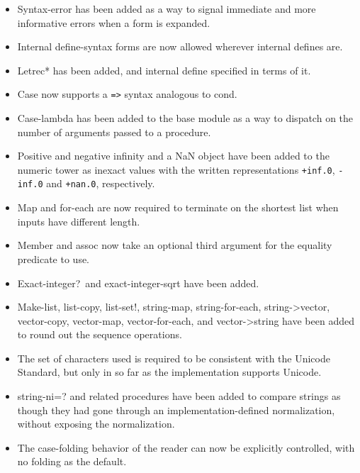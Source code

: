 \begin{itemize}
\item {\cf Syntax-error} has been added as a way to signal immediate
and more informative errors when a form is expanded.

\item Internal {\cf define-syntax} forms are now allowed wherever
internal {\cf define}s are.

\item {\cf Letrec*} has been added, and internal define specified in
terms of it.

\item {\cf Case} now supports a {\tt =>} syntax analogous to {\cf cond}.

\item {\cf Case-lambda} has been added to the base module as a way to
dispatch on the number of arguments passed to a procedure.

\item Positive and negative infinity and a NaN object have been added
to the numeric tower as inexact values with the written
representations {\tt +inf.0}, {\tt -inf.0} and {\tt +nan.0},
respectively.

\item {\cf Map} and {\cf for-each} are now required to terminate on
the shortest list when inputs have different length.

\item {\cf Member} and {\cf assoc} now take an optional third argument
for the equality predicate to use.

\item {\cf Exact-integer?}\  and {\cf exact-integer-sqrt} have been added.

\item {\cf Make-list}, {\cf list-copy}, {\cf list-set!}, {\cf
string-map}, {\cf string-for-each}, {\cf string->vector}, {\cf
vector-copy}, {\cf vector-map}, {\cf vector-for-each}, and {\cf
vector->string} have been added to round out the sequence operations.

\item The set of characters used is required to be consistent with the
Unicode Standard, but only in so far as the implementation supports
Unicode.

\item {\cf string-ni=?} and related procedures have been added to
compare strings as though they had gone through an
implementation-defined normalization, without exposing the
normalization.

\item The case-folding behavior of the reader can now be explicitly
controlled, with no folding as the default.


\end{itemize}
